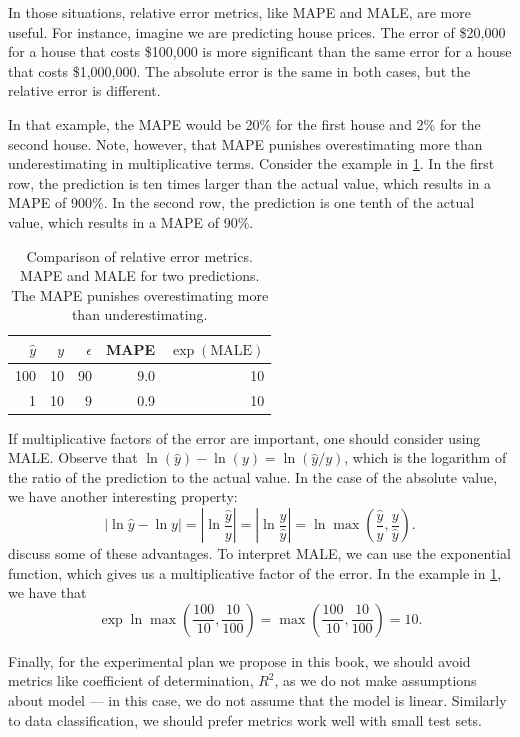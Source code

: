 In those situations, relative error metrics, like MAPE and MALE, are more useful.  For
instance, imagine we are predicting house prices.  The error of \$20,000
for a house that costs \$100,000 is more significant than the same error for a house that
costs \$1,000,000.  The absolute error is the same in both cases, but the relative error
is different.

In that example, the MAPE would be 20\% for the first house and 2\% for the second house.
Note, however, that MAPE punishes overestimating more than underestimating in
multiplicative terms.  Consider the example in \cref{tab:MAPEvsMALE}.  In the first row,
the prediction is ten times larger than the actual value, which results in a MAPE of
900\%.  In the second row, the prediction is one tenth of the actual value, which results
in a MAPE of 90\%.

\begin{table}
  \caption{
    Comparison of relative error metrics.  MAPE and MALE for two predictions.  The MAPE
    punishes overestimating more than underestimating.
  }
  \label{tab:MAPEvsMALE}
  \centering
  \begin{tabular}{r r r r r}
    \toprule
    $\hat{y}$ & $y$ & $\epsilon$ & MAPE & $\exp(\text{MALE})$ \\
    \midrule
    100 & 10 & 90 & 9.0 & 10 \\
      1 & 10 &  9 & 0.9 & 10 \\
    \bottomrule
  \end{tabular}
\end{table}

If multiplicative factors of the error are important, one should consider using MALE.
Observe that $\ln(\hat{y}) - \ln(y) = \ln(\hat{y}/y)$, which is the logarithm of the
ratio of the prediction to the actual value.  In the case of the absolute value, we have
another interesting property: \[
  |\ln\hat{y} - \ln y| =
    |\ln\frac{\hat{y}}{y}| =
    |\ln\frac{y}{\hat{y}}| =
    \ln\max\left(\frac{\hat{y}}{y}, \frac{y}{\hat{y}}\right)\text{.}
\]
\textcite{Tofallis2015} discuss some of these advantages.  To
interpret MALE, we can use the exponential function, which gives us a multiplicative
factor of the error.  In the example in \cref{tab:MAPEvsMALE}, we have that \[
  \exp\ln\max\left(\frac{100}{10}, \frac{10}{100}\right) =
    \max\left(\frac{100}{10}, \frac{10}{100}\right) = 10\text{.}
\]

Finally, for the experimental plan we propose in this book, we should avoid metrics like
coefficient of determination, $R^2$, as we do not make assumptions about model --- in this
case, we do not assume that the model is linear.  Similarly to data classification, we
should prefer metrics work well with small test sets.

